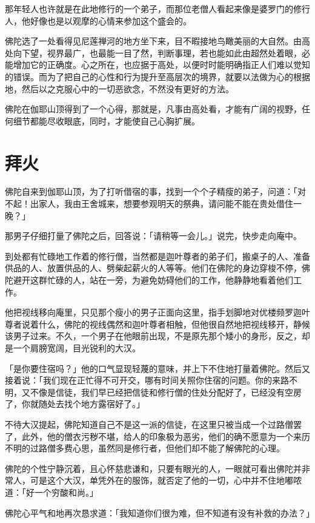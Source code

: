 \documentclass[twoside,openany]{book}
\begin{document}
那年轻人也许就是在此地修行的一个弟子，而那位老僧人看起来像是婆罗门的修行人，他好像也是以观摩的心情来参加这个盛会的。

佛陀选了一处看得见尼莲禅河的地方坐下来，目不暇接地鸟瞰美丽的大自然。由高处向下望，视界最广，也最能一目了然，判断事理，若也能如此由超然处着眼，必能增加它的正确度。心之所在，也应据于高处，以便时时能明确指正人们难以觉知的错误。而为了把自己的心性和行为提升至高层次的境界，就要以法做为心的根据地，然后以之克服心中的一切恶欲念，不然没有更好的方法。

佛陀在伽耶山顶得到了一个心得，那就是，凡事由高处看，才能有广阔的视野，任何细节都能尽收眼底，同时，才能使自己心胸扩展。

\section{拜火}\label{sec3.4}

佛陀自来到伽耶山顶，为了打听借宿的事，找到一个个子精瘦的弟子，问道：「对不起！出家人，我由王舍城来，想要参观明天的祭典，请问能不能在贵处借住一晚？」

那男子仔细打量了佛陀之后，回答说：「请稍等一会儿。」说完，快步走向庵中。

到处都有忙碌地工作着的修行僧，当然都是迦叶尊者的弟子们，搬桌子的人、准备供品的人、放置供品的人、劈柴起薪火的人等等。他们在佛陀的身边穿梭不停，佛陀避开这群忙碌的人，站在一旁，为避免妨碍他们的工作，他静静地看着他们工作。

他把视线移向庵里，只见那个瘦小的男子正面向这里，指手划脚地对优楼频罗迦叶尊者说着什么，佛陀的视线偶然和迦叶尊者相触，但他很自然地把视线移开，静候该男子过来。不久，一个男子在他眼前出现，不是原先那个矮小的身形，反之，却是一个肩膀宽阔，目光锐利的大汉。

「是你要住宿吗？」他的口气显现轻蔑的意味，并上下不住地打量着佛陀。然后又接着说：「我们现在正忙得不可开交，哪有时间关照你住宿的问题。你的来路不明，又不像是信徒，我们早已经把信徒和修行僧的住处分配好了，已经没有空房了，你就随处去找个地方露宿好了。」

不待大汉提起，佛陀知道自己不是这一派的信徒，在这里只被当成一个过路僧罢了，此外，他的僧衣污秽不堪，给人的印象极为恶劣，他们的确不愿意为一个来历不明的过路僧多费心思，虽然同是修行者，但他们却不能了解佛陀的心理。

佛陀的个性宁静沉着，且心怀慈悲谦和，只要有眼光的人，一眼就可看出佛陀并非常人，可是这个大汉，单凭外在的服饰，就否定了他的一切，心中并不住地嘟哝道：「好一个穷酸和尚。」

佛陀心平气和地再次恳求道：「我知道你们很为难，但不知道有没有补救的办法？」
\end{document}
